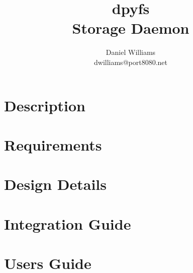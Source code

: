\documentclass[letterpaper]{article}
\title{dpyfs \\ Storage Daemon}
\author{Daniel Williams \\ dwilliams@port8080.net}
\begin{document}
\maketitle

\section{Description}

\section{Requirements}

\section{Design Details}

\section{Integration Guide}

\section{Users Guide}

\end{document}
